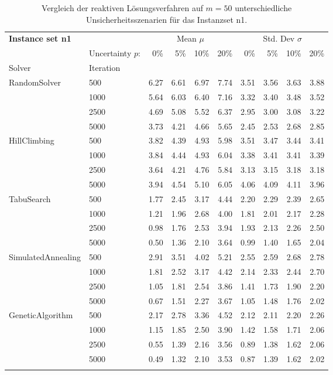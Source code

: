 {\footnotesize
\begin{longtable}{ll|rrrr|rrrr}
\toprule
\textbf{Instance set n1}                 & {} & \multicolumn{4}{c|}{Mean $\mu$} & \multicolumn{4}{c}{Std. Dev $\sigma$} \\
                & Uncertainty $p$: & 0\% & 5\% & 10\% & 20\% & 0\% & 5\% & 10\% & 20\% \\
Solver & Iteration &      &      &      &      &      &      &      &      \\
\midrule
RandomSolver & 500  & 6.27 & 6.61 & 6.97 & 7.74 & 3.51 & 3.56 & 3.63 & 3.88 \\
                 & 1000 & 5.64 & 6.03 & 6.40 & 7.16 & 3.32 & 3.40 & 3.48 & 3.52 \\
                 & 2500 & 4.69 & 5.08 & 5.52 & 6.37 & 2.95 & 3.00 & 3.08 & 3.22 \\
                 & 5000 & 3.73 & 4.21 & 4.66 & 5.65 & 2.45 & 2.53 & 2.68 & 2.85 \\ \hline
HillClimbing & 500  & 3.82 & 4.39 & 4.93 & 5.98 & 3.51 & 3.47 & 3.44 & 3.41 \\
                 & 1000 & 3.84 & 4.44 & 4.93 & 6.04 & 3.38 & 3.41 & 3.41 & 3.39 \\
                 & 2500 & 3.64 & 4.21 & 4.76 & 5.84 & 3.13 & 3.15 & 3.18 & 3.18 \\
                 & 5000 & 3.94 & 4.54 & 5.10 & 6.05 & 4.06 & 4.09 & 4.11 & 3.96 \\ \hline
TabuSearch & 500  & 1.77 & 2.45 & 3.17 & 4.44 & 2.20 & 2.29 & 2.39 & 2.65 \\
                 & 1000 & 1.21 & 1.96 & 2.68 & 4.00 & 1.81 & 2.01 & 2.17 & 2.28 \\
                 & 2500 & 0.98 & 1.76 & 2.53 & 3.94 & 1.93 & 2.13 & 2.26 & 2.50 \\
                 & 5000 & 0.50 & 1.36 & 2.10 & 3.64 & 0.99 & 1.40 & 1.65 & 2.04 \\ \hline
SimulatedAnnealing & 500  & 2.91 & 3.51 & 4.02 & 5.21 & 2.55 & 2.59 & 2.68 & 2.78 \\
                 & 1000 & 1.81 & 2.52 & 3.17 & 4.42 & 2.14 & 2.33 & 2.44 & 2.70 \\
                 & 2500 & 1.05 & 1.81 & 2.54 & 3.86 & 1.41 & 1.73 & 1.90 & 2.20 \\
                 & 5000 & 0.67 & 1.51 & 2.27 & 3.67 & 1.05 & 1.48 & 1.76 & 2.02 \\ \hline
GeneticAlgorithm & 500  & 2.17 & 2.78 & 3.36 & 4.52 & 2.12 & 2.11 & 2.20 & 2.26 \\
                 & 1000 & 1.15 & 1.85 & 2.50 & 3.90 & 1.42 & 1.58 & 1.71 & 2.06 \\
                 & 2500 & 0.55 & 1.39 & 2.16 & 3.56 & 0.89 & 1.38 & 1.62 & 2.06 \\
                 & 5000 & 0.49 & 1.32 & 2.10 & 3.53 & 0.87 & 1.39 & 1.62 & 2.02 \\
\bottomrule
\caption{Vergleich der reaktiven Lösungsverfahren auf $m=50$ unterschiedliche Unsicherheitsszenarien für das Instanzset n1. }
\label{tab:evaluation_reactive_n1}
\end{longtable}
}
\vspace*{-25px}
\begin{figure}[H]
\end{figure}